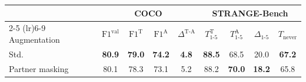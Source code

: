\begin{tabular}{l cccc cccc}
\toprule
& \multicolumn{4}{c}{\textbf{COCO}} & \multicolumn{4}{c}{\textbf{STRANGE-Bench}} \\
\cmidrule(lr){2-5} \cmidrule(lr){6-9}
Augmentation & $\text{F1}^{\text{val}}$ & $\text{F1}^{\text{T}}$ & $\text{F1}^{\text{A}}$ & $\Delta^{\text{T-A}}$ & $T_{1\text{-}5}^{\text{T}}$ & $T_{1\text{-}5}^{\text{A}}$ & $\Delta_{1\text{-}5}$ & $T_{\text{never}}$ \\
\midrule
Std. & \textbf{80.9} & \textbf{79.0} & \textbf{74.2} & \textbf{4.8} & \textbf{88.5} & 68.5 & 20.0 & \textbf{67.2} \\
Partner masking & 80.1 & 78.3 & 73.1 & 5.2 & 88.2 & \textbf{70.0} & \textbf{18.2} & 65.8 \\
\bottomrule
\end{tabular}
